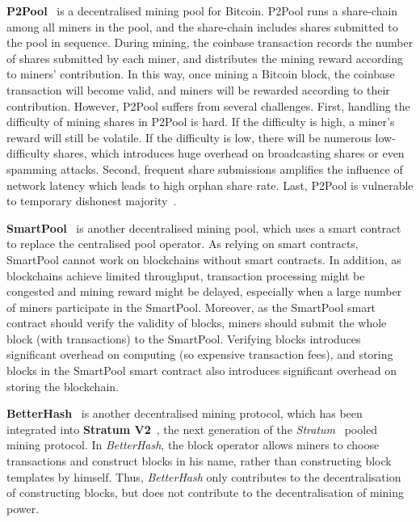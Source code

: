 \textbf{P2Pool}~\cite{voight2011p2pool} is a decentralised mining pool for Bitcoin.
P2Pool runs a share-chain among all miners in the pool, and the share-chain includes shares submitted to the pool in sequence.
During mining, the coinbase transaction records the number of shares submitted by each miner, and distributes the mining reward according to miners' contribution.
In this way, once mining a Bitcoin block, the coinbase transaction will become valid, and miners will be rewarded according to their contribution.
However, P2Pool suffers from several challenges.
First, handling the difficulty of mining shares in P2Pool is hard.
If the difficulty is high, a miner's reward will still be volatile.
If the difficulty is low, there will be numerous low-difficulty shares, which introduces huge overhead on broadcasting shares or even spamming attacks.
Second, frequent share submissions amplifies the influence of network latency which leads to high orphan share rate.
Last, P2Pool is vulnerable to temporary dishonest majority~\cite{decentralised-mining-pool-security}.

\textbf{SmartPool}~\cite{luu2017smartpool} is another decentralised mining pool, which uses a smart contract to replace the centralised pool operator.
As relying on smart contracts, SmartPool cannot work on blockchains without smart contracts.
In addition, as blockchains achieve limited throughput, transaction processing might be congested and mining reward might be delayed, especially when a large number of miners participate in the SmartPool.
Moreover, as the SmartPool smart contract should verify the validity of blocks, miners should submit the whole block (with transactions) to the SmartPool.
Verifying blocks introduces significant overhead on computing (so expensive transaction fees), and storing blocks in the SmartPool smart contract also introduces significant overhead on storing the blockchain.



\textbf{BetterHash}~\cite{draft-bip-BetterHash} is another decentralised mining protocol, which has been integrated into \textbf{Stratum V2}~\cite{stratum-v2}, the next generation of the \textit{Stratum}~\cite{stratum} pooled mining protocol.
In \textit{BetterHash}, the block operator allows miners to choose transactions and construct blocks in his name, rather than constructing block templates by himself.
Thus, \textit{BetterHash} only contributes to the decentralisation of constructing blocks, but does not contribute to the decentralisation of mining power.

